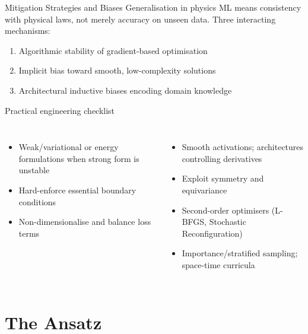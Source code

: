 \documentclass[aspectratio=169,10pt]{beamer}
\begin{document}
\begin{frame}{Mitigation Strategies and Biases}
  Generalisation in physics ML means \alert{consistency with physical laws},
  not merely accuracy on unseen data. Three interacting mechanisms:
  \begin{enumerate}
    \item Algorithmic stability of gradient-based optimisation
    \item Implicit bias toward smooth, low-complexity solutions
    \item Architectural inductive biases encoding domain knowledge
  \end{enumerate}

  \vspace{0.3cm}
  \begin{block}{Practical engineering checklist}
    \small
    \begin{columns}[T]
        \begin{itemize}
          \item Weak/variational or energy formulations when strong form
                is unstable
          \item Hard-enforce essential boundary conditions
          \item Non-dimensionalise and balance loss terms
        \end{itemize}
        \begin{itemize}
          \item Smooth activations; architectures controlling derivatives
          \item Exploit symmetry and equivariance
          \item Second-order optimisers (L-BFGS, Stochastic Reconfiguration)
          \item Importance/stratified sampling; space-time curricula
        \end{itemize}
    \end{columns}
  \end{block}
\end{frame}

\section{The Ansatz}
\end{document}
